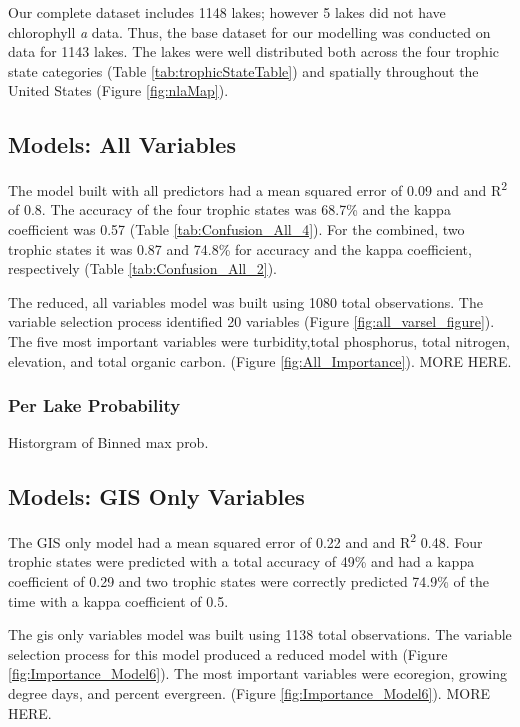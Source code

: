 \documentclass[11pt,]{article}
\begin{document}
Our complete dataset includes 1148 lakes; however 5 lakes did not have
chlorophyll \emph{a} data. Thus, the base dataset for our modelling was
conducted on data for 1143 lakes. The lakes were well distributed both
across the four trophic state categories (Table
\ref{tab:trophicStateTable}) and spatially throughout the United States
(Figure \ref{fig:nlaMap}).

\subsection{Models: All Variables}\label{models-all-variables}

The model built with all predictors had a mean squared error of 0.09 and
and R\textsuperscript{2} of 0.8. The accuracy of the four trophic states
was 68.7\% and the kappa coefficient was 0.57 (Table
\ref{tab:Confusion_All_4}). For the combined, two trophic states it was
0.87 and 74.8\% for accuracy and the kappa coefficient, respectively
(Table \ref{tab:Confusion_All_2}).

The reduced, all variables model was built using 1080 total
observations. The variable selection process identified 20 variables
(Figure \ref{fig:all_varsel_figure}). The five most important variables
were turbidity,total phosphorus, total nitrogen, elevation, and total
organic carbon. (Figure \ref{fig:All_Importance}). MORE HERE.

\subsubsection{Per Lake Probability}\label{per-lake-probability}

Historgram of Binned max prob.

\subsection{Models: GIS Only Variables}\label{models-gis-only-variables}

The GIS only model had a mean squared error of 0.22 and and
R\textsuperscript{2} 0.48. Four trophic states were predicted with a
total accuracy of 49\% and had a kappa coefficient of 0.29 and two
trophic states were correctly predicted 74.9\% of the time with a kappa
coefficient of 0.5.

The gis only variables model was built using 1138 total observations.
The variable selection process for this model produced a reduced model
with (Figure \ref{fig:Importance_Model6}). The most important variables
were ecoregion, growing degree days, and percent evergreen. (Figure
\ref{fig:Importance_Model6}). MORE HERE.
\end{document}
